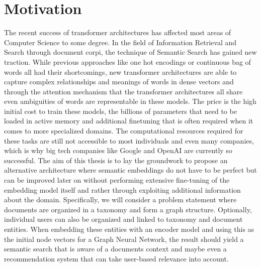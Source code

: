 \documentclass[draft,final]{vutinfth} %
\begin{document}
\section{Motivation}
The recent success of transformer architectures has affected most areas of Computer Science to some degree. In the field of Information Retrieval and Search through document corpi, the technique of Semantic Search has gained new traction. While previous approaches like one hot encodings or continuous bag of words all had their shortcomings, new transformer architectures are able to capture complex relationships and meanings of words in dense vectors and through the attention mechanism that the transformer architectures all share even ambiguities of words are representable in these models.
The price is the high initial cost to train these models, the billions of parameters that need to be loaded in active memory and additional finetuning that is often required when it comes to more specialized domains.
The computational resources required for these tasks are still not accessible to most individuals and even many companies, which is why big tech companies like Google and OpenAI are currently so successful. The aim of this thesis is to lay the groundwork to propose an alternative architecture where semantic embeddings do not have to be perfect but can be improved later on without performing extensive fine-tuning of the embedding model itself and rather through exploiting additional information about the domain. Specifically, we will consider a problem statement where documents are organized in a taxonomy and form a graph structure. Optionally, individual users can also be organized and linked to taxonomy and document entities. When embedding these entities with an encoder model and using this as the initial node vectors for a Graph Neural Network, the result should yield a semantic search that is aware of a documents context and maybe even a recommendation system that can take user-based relevance into account.
\end{document}
